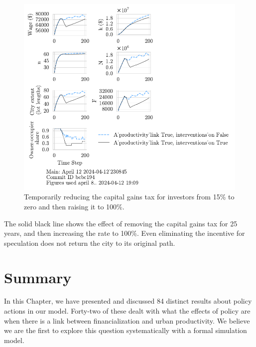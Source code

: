 \begin{figure}[h!tb] 
    \centering
    \includegraphics[scale=1., trim={0 1.4cm 5cm 0},clip]{fig/link-interv_CGI-B-pt15_0-50_1-75230845.pdf}%
    \caption[Temporarily reducing the capital gains tax for investors from a low level]{Temporarily reducing the capital gains tax for investors from 15\% to zero and then raising it to 100\%.}
    \label{fig:cgtax_setback2}
\end{figure}


The solid black line shows the effect of removing the capital gains tax for 25 years, and then increasing the rate to 100\%. Even eliminating the incentive for speculation does not return the city to its original path.


\section{Summary}
In this Chapter, we have presented and discussed 84 distinct results about policy actions in our model. Forty-two of these dealt with what the effects of policy are when there is a link between financialization and urban productivity. We believe we are the first to explore this question systematically with a formal simulation model.


